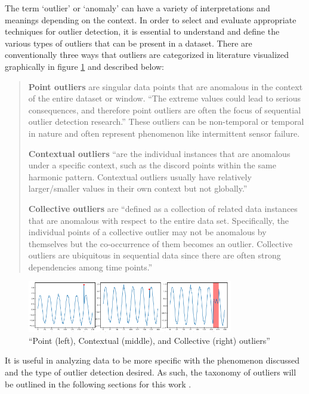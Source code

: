 The term `outlier' or `anomaly' can have a variety of interpretations and meanings depending on the context. In order to select and evaluate appropriate techniques for outlier detection, it is essential to understand and define the various types of outliers that can be present in a dataset. There are conventionally three ways that outliers are categorized in literature visualized graphically in figure \ref{fig:outliers-graphic} and described below:
\blockquote{
\textbf{Point outliers} are singular data points that are anomalous in the context of the entire dataset or window. \enquote{The extreme values could lead to serious consequences, and therefore point outliers are often the focus of sequential outlier detection research.}\parencite{lai2021revisiting} These outliers can be non-temporal or temporal in nature and often represent phenomenon like intermittent sensor failure. 

\textbf{Contextual outliers}  \enquote{are the individual instances that are anomalous under a specific context, such as
the discord points within the same harmonic pattern. Contextual outliers usually have relatively
larger/smaller values in their own context but not globally.}\parencite{lai2021revisiting}

\textbf{Collective outliers} are \enquote{defined as a collection of related data instances that are anomalous with respect
to the entire data set. Specifically, the individual points of a collective outlier may not be anomalous
by themselves but the co-occurrence of them becomes an outlier. Collective outliers are ubiquitous
in sequential data since there are often strong dependencies among time points.}\parencite{lai2021revisiting}
}

\begin{figure}[H]
    \includegraphics[width=0.8\textwidth]{Images/outliers_graphic.PNG}
    \caption{\enquote{Point (left), Contextual (middle), and Collective (right) outliers} \parencite{lai2021revisiting}}
    \label{fig:outliers-graphic}
\end{figure}

It is useful in analyzing data to be more specific with the phenomenon discussed and the type of outlier detection desired. As such, the taxonomy of outliers will be outlined in the following sections for this work \parencite{lai2021revisiting}.

